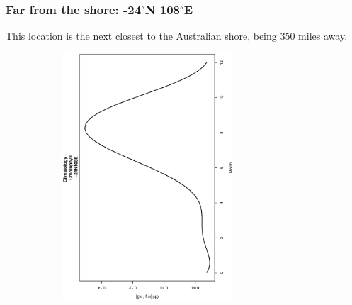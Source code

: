 \pagebreak

\subsubsection{Far from the shore: -24$^{\circ}$N 108$^{\circ}$E}

This location is the next closest to the Australian shore, being 350 miles away. 

\begin{figure}[ht]
    \centering
    \begin{subfigure}[t]{0.5\textwidth}
        \centering
        \includegraphics[width=0.7\textwidth, angle =-90]{Chapter3/-24,108/Data_-24N108E_Chl_Climatology.eps}
    \end{subfigure}%
    ~ 
    \begin{subfigure}[t]{0.5\textwidth}
        \centering

\end{subfigure}
\end{figure}
